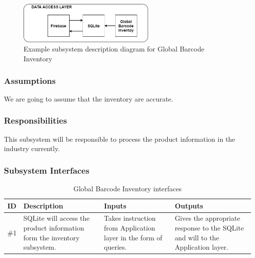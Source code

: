 \begin{figure}[h!]
	\centering
 	\includegraphics[width=0.60\textwidth]{images/DS.jpg}
 \caption{Example subsystem description diagram for Global Barcode Inventory}
\end{figure}

\subsubsection{Assumptions}
We are going to assume that the inventory are accurate.

\subsubsection{Responsibilities}
This subsystem will be responsible to process the product information in the industry currently. 

\subsubsection{Subsystem Interfaces}
\begin {table}[H]
\caption {Global Barcode Inventory interfaces} 
\begin{center}
    \begin{tabular}{ | p{1cm} | p{6cm} | p{3cm} | p{3cm} |}
    \hline
    ID & Description & Inputs & Outputs \\ \hline
    \#1 & SQLite will access the product information form the inventory subsystem. & Takes instruction from Application layer in the form of queries. & Gives the appropriate response to the SQLite and will to the Application layer.\\ \hline
    \end{tabular}
\end{center}
\end{table}

